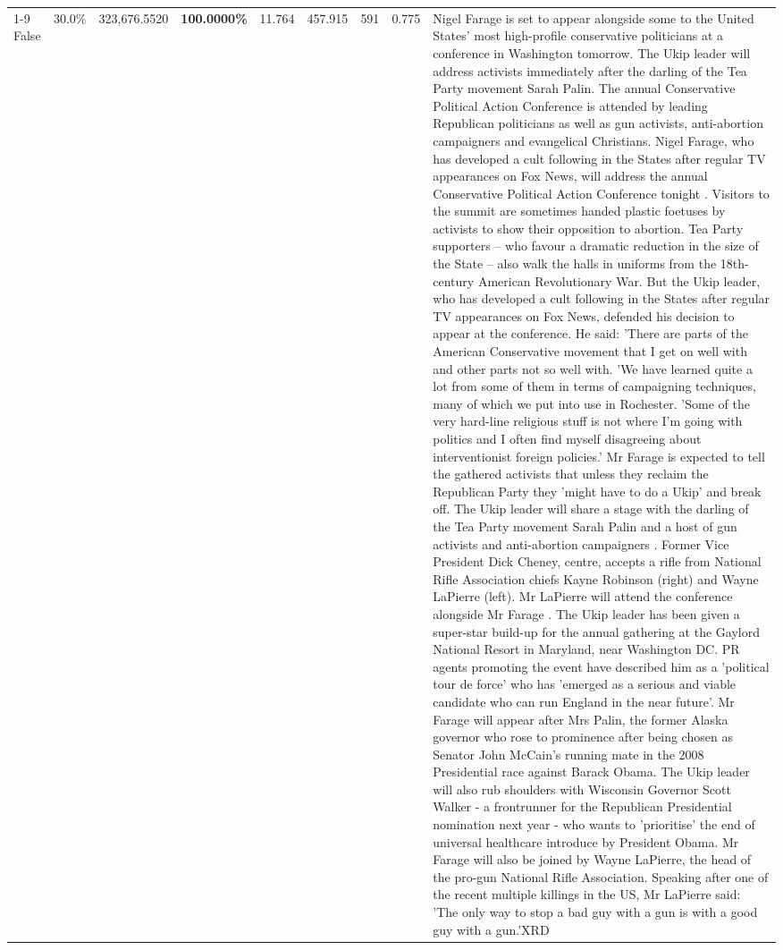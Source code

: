 \begin{table}[H]
\begin{tabular}{lllrlllll}
\cline{1-9}
False & 30.0\% & 323,676.5520 & \bfseries \color{red} 100.0000\% & 11.764 & 457.915 & 591 & 0.775 & Nigel Farage is set to appear alongside some to the United States' most high-profile conservative politicians at a conference in Washington tomorrow. The Ukip leader will address activists immediately after the darling of the Tea Party movement Sarah Palin. The annual Conservative Political Action Conference is attended by leading Republican politicians as well as gun activists, anti-abortion campaigners and evangelical Christians. Nigel Farage, who has developed a cult following in the States after regular TV appearances on Fox News, will address the annual Conservative Political Action Conference tonight . Visitors to the summit are sometimes handed plastic foetuses by activists to show their opposition to abortion. Tea Party supporters – who favour a dramatic reduction in the size of the State – also walk the halls in uniforms from the 18th-century American Revolutionary War. But the Ukip leader, who has developed a cult following in the States after regular TV appearances on Fox News, defended his decision to appear at the conference. He said: 'There are parts of the American Conservative movement that I get on well with and other parts not so well with. 'We have learned quite a lot from some of them in terms of campaigning techniques, many of which we put into use in Rochester. 'Some of the very hard-line religious stuff is not where I'm going with politics and I often find myself disagreeing about interventionist foreign policies.' Mr Farage is expected to tell the gathered activists that unless they reclaim the Republican Party they 'might have to do a Ukip' and break off. The Ukip leader will share a stage with the darling of the Tea Party movement Sarah Palin and a host of gun activists and anti-abortion campaigners . Former Vice President Dick Cheney, centre, accepts a rifle from National Rifle Association chiefs Kayne Robinson (right) and Wayne LaPierre (left). Mr LaPierre will attend the conference alongside Mr Farage . The Ukip leader has been given a super-star build-up for the annual gathering at the Gaylord National Resort in Maryland, near Washington DC. PR agents promoting the event have described him as a 'political tour de force' who has 'emerged as a serious and viable candidate who can run England in the near future'. Mr Farage will appear after Mrs Palin, the former Alaska governor who rose to prominence after being chosen as Senator John McCain's running mate in the 2008 Presidential race against Barack Obama. The Ukip leader will also rub shoulders with Wisconsin Governor Scott Walker - a frontrunner for the Republican Presidential nomination next year - who wants to 'prioritise' the end of universal healthcare introduce by President Obama. Mr Farage will also be joined by Wayne LaPierre, the head of the pro-gun National Rifle Association. Speaking after one of the recent multiple killings in the US, Mr LaPierre said: 'The only way to stop a bad guy with a gun is with a good guy with a gun.'XRD \\

\end{tabular}
\end{table}
